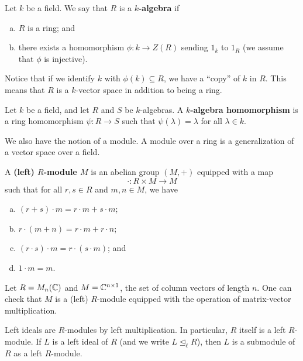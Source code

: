 \begin{defn}{}
Let $k$ be a field. We say that $R$ is a {\bf $k$-algebra} if 
\begin{enumerate}[(a)]
    \item $R$ is a ring; and 
    \item there exists a homomorphism $\phi : k \to Z(R)$ sending $1_k$ to $1_R$ (we assume that $\phi$ is injective).
\end{enumerate}
\end{defn}

Notice that if we identify $k$ with $\phi(k) \subseteq R$, we have a ``copy'' of $k$ in $R$. This 
means that $R$ is a $k$-vector space in addition to being a ring. 

\begin{defn}{}
Let $k$ be a field, and let $R$ and $S$ be $k$-algebras.
A {\bf $k$-algebra homomorphism} is a ring homomorphism $\psi : R \to S$ such that $\psi(\lambda) = \lambda$ for all 
$\lambda \in k$. 
\end{defn}

We also have the notion of a module. A module over a ring is a generalization of a 
vector space over a field. 

\begin{defn}{}
A {\bf (left) $R$-module $M$} is an abelian group $(M, +)$ equipped with a map 
\[ \cdot : R \times M \to M \] 
such that for all $r, s \in R$ and $m, n \in M$, we have 
\begin{enumerate}[(a)]
    \item $(r + s) \cdot m = r \cdot m + s \cdot m$; 
    \item $r \cdot (m + n) = r \cdot m + r \cdot n$;
    \item $(r \cdot s) \cdot m = r \cdot (s \cdot m)$; and 
    \item $1 \cdot m = m$.
\end{enumerate}
\end{defn}

\begin{exmp}{}
Let $R = M_n(\mathbb{C})$ and $M = \mathbb{C}^{n \times 1}$, the set of column vectors of length $n$. One can check that 
$M$ is a (left) $R$-module equipped with the operation of matrix-vector multiplication.
\end{exmp}

\begin{exmp}{}
Left ideals are $R$-modules by left multiplication. In particular, $R$ itself is a left $R$-module. If 
$L$ is a left ideal of $R$ (and we write $L \trianglelefteq_\ell R$), then $L$ is a 
submodule of $R$ as a left $R$-module.
\end{exmp}

